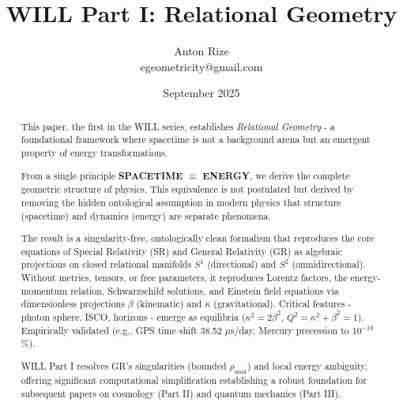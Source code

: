 \documentclass[12pt, a4paper]{article}
\title{WILL Part I: Relational Geometry}
\author{Anton Rize \\  egeometricity@gmail.com}
\date{September 2025}
\begin{document}
\maketitle
\begin{center}
\end{center}


\newpage

\begin{abstract}
This paper, the first in the WILL series, establishes \textit{Relational Geometry} - a foundational framework where spacetime is not a background arena but an emergent property of energy transformations. 

From a single principle \textbf{SPACETIME $\equiv$ ENERGY}, we derive the complete geometric structure of physics. This equivalence is not postulated but derived by removing the hidden ontological assumption in modern physics that structure (spacetime) and dynamics (energy) are separate phenomena. 

The result is a singularity-free, ontologically clean formalism that reproduces the core equations of Special Relativity (SR) and General Relativity (GR) as algebraic projections on closed relational manifolds $S^1$ (directional) and $S^2$ (omnidirectional). Without metrics, tensors, or free parameters, it reproduces Lorentz factors, the energy-momentum relation, Schwarzschild solutions, and Einstein field equations via dimensionless projections $\beta$ (kinematic) and $\kappa$ (gravitational). Critical features - photon sphere, ISCO, horizons - emerge as equilibria ($\kappa^2 = 2\beta^2$, $Q^2 = \kappa^2 + \beta^2 = 1$). Empirically validated (e.g., GPS time shift 38.52 $\mu$s/day, Mercury precession to $10^{-10}$\%).

WILL Part I resolves GR's singularities (bounded $\rho_{\max}$) and local energy ambiguity, offering significant computational simplification establishing a robust foundation for subsequent papers on cosmology (Part II) and quantum mechanics (Part III).
\end{abstract}
\end{document}
